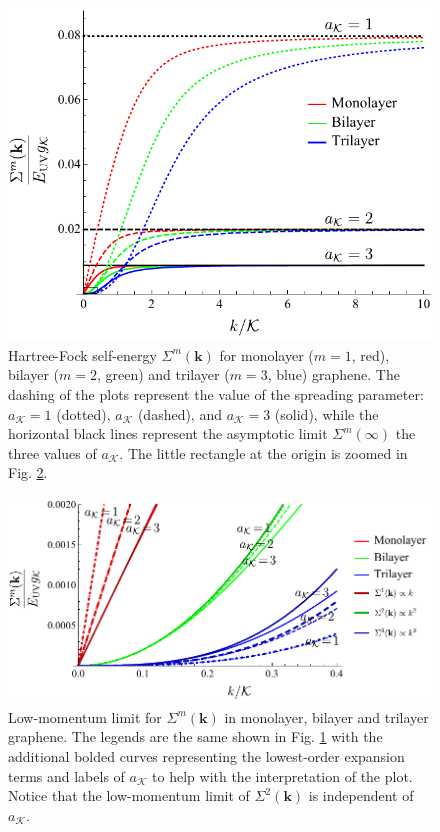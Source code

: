 \documentclass[english,aps,prd,nofootinbib,twocolumn]{revtex4-1}
\begin{document}
\begin{figure}[h]
\centering
\includegraphics[scale=0.6]{SelfEnergyPlot123.pdf}
\caption{Hartree-Fock self-energy $\Sigma^{m}(\mathbf{k})$ for monolayer ($m=1$, red), bilayer ($m=2$, green) and trilayer ($m=3$, blue) graphene. The dashing of the plots represent the value of the spreading parameter: $a_{\mathcal{K}}=1$ (dotted), $a_{\mathcal{K}}$ (dashed), and $a_{\mathcal{K}}=3$ (solid), while the horizontal black lines represent the asymptotic limit $\Sigma^{m}(\infty)$ the three values of $a_{\mathcal{K}}$. The little rectangle at the origin is zoomed in Fig. \ref{fig:Multilayer-Self-Energies-Taylor}.}
\label{fig:Multilayer-Self-Energies}

\end{figure}
\begin{figure}[h]
\centering
\includegraphics[scale=0.6]{SelfEnergyPlot123Taylor.pdf}
\caption{Low-momentum limit for $\Sigma^{m}(\mathbf{k})$ in monolayer, bilayer and trilayer graphene. The legends are the same shown in Fig. \ref{fig:Multilayer-Self-Energies} with the additional bolded curves representing the lowest-order expansion terms and labels of $a_{\mathcal{K}}$ to help with the interpretation of the plot. Notice that the low-momentum limit of $\Sigma^{2}(\mathbf{k})$ is independent of $a_{\mathcal{K}}$.}
\label{fig:Multilayer-Self-Energies-Taylor}
\end{figure}
\end{document}
